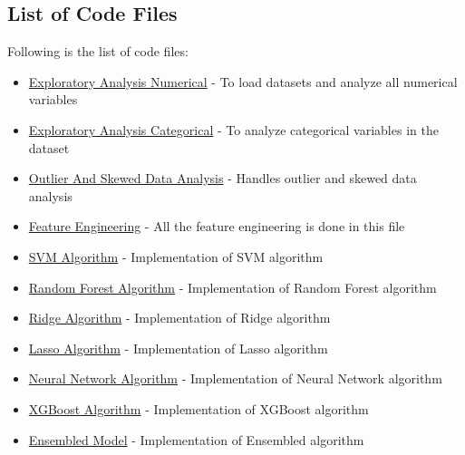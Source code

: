 \documentclass[sigconf]{acmart}
\begin{document}
    \subsection{List of Code Files}    
    Following is the list of code files:
    \begin{itemize}
    	\item \href{https://github.com/bigdata-i523/hid306/blob/master/project/code/1.1_exploratory_analysis_numerical.ipynb}{Exploratory Analysis Numerical} - To load datasets and analyze all numerical variables
    	
    	\item \href{https://github.com/bigdata-i523/hid306/blob/master/project/code/1.2_exploratory_analysis_categorical.ipynb}{Exploratory Analysis Categorical} - To analyze categorical variables in the dataset
    	
    	\item \href{https://github.com/bigdata-i523/hid306/blob/master/project/code/1.3_outlier_and_skewed_data_analysis.ipynb}{Outlier And Skewed Data Analysis} - Handles outlier and skewed data analysis
    	
    	\item \href{https://github.com/bigdata-i523/hid306/blob/master/project/code/1.4_feature_engineering.ipynb}{Feature Engineering} - All the feature engineering is done in this file
    	
    	\item \href{https://github.com/bigdata-i523/hid306/blob/master/project/code/2.1_algorithm_svm.ipynb}{SVM Algorithm} - Implementation of SVM algorithm
    	
    	\item \href{https://github.com/bigdata-i523/hid306/blob/master/project/code/2.2_algorithm_random_forest.ipynb}{Random Forest Algorithm} - Implementation of Random Forest algorithm
    	
    	\item \href{https://github.com/bigdata-i523/hid306/blob/master/project/code/2.3_algorithm_ridge.ipynb}{Ridge Algorithm} - Implementation of Ridge algorithm
    	
    	\item \href{https://github.com/bigdata-i523/hid306/blob/master/project/code/2.4_algorithm_lasso.ipynb}{Lasso Algorithm} - Implementation of Lasso algorithm
    	
    	\item \href{https://github.com/bigdata-i523/hid306/blob/master/project/code/2.5_algorithm_neural_network_tf.ipynb}{Neural Network Algorithm} - Implementation of Neural Network algorithm
    	
    	\item \href{https://github.com/bigdata-i523/hid306/blob/master/project/code/2.6_algorithm_xgboost.ipynb}{XGBoost Algorithm} - Implementation of XGBoost algorithm
    	
    	\item \href{https://github.com/bigdata-i523/hid306/blob/master/project/code/3_ensemble_kaggle_submission.ipynb}{Ensembled Model} - Implementation of Ensembled algorithm
    \end{itemize}    
    
\end{document}
